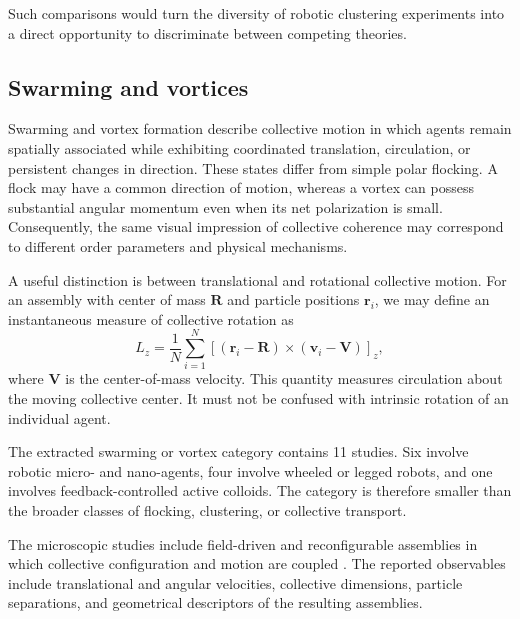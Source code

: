 Such comparisons
would turn the
diversity of
robotic clustering
experiments into
a direct opportunity
to discriminate
between competing
theories.

\subsection{Swarming and vortices}
\label{sec:phenomena-swarming}

Swarming and vortex formation describe collective motion in which
agents remain spatially associated while exhibiting coordinated
translation, circulation, or persistent changes in direction.
These states differ from simple polar flocking. A flock may have
a common direction of motion, whereas a vortex can possess
substantial angular momentum even when its net polarization
is small. Consequently, the same visual impression of
collective coherence may correspond to different order
parameters and physical mechanisms.

A useful distinction is between translational and rotational
collective motion. For an assembly with center of mass
$\mathbf R$ and particle positions $\mathbf r_i$, we may
define an instantaneous measure of collective rotation as
\begin{equation}
L_z =
\frac{1}{N}
\sum_{i=1}^{N}
\left[
(\mathbf r_i-\mathbf R)
\times
(\mathbf v_i-\mathbf V)
\right]_z ,
\label{eq:phenomena-angular-momentum}
\end{equation}
where $\mathbf V$ is the center-of-mass velocity.
This quantity measures circulation about the moving
collective center. It must not be confused with
intrinsic rotation of an individual agent.

The extracted swarming or vortex category contains
11 studies. Six involve robotic micro- and nano-agents,
four involve wheeled or legged robots, and one involves
feedback-controlled active colloids. The category is
therefore smaller than the broader classes of flocking,
clustering, or collective transport.

The microscopic studies include field-driven and
reconfigurable assemblies in which collective
configuration and motion are coupled
\cite{Tural2025dropletbasedmicrof,Chen2023nanorobotmediateds,Hanson2025electrokineticpropu,Liu2026magneticcompartment,Wang2022reconfigurablemagne,Yu2019reconfigurablecollo}.
The reported observables include translational and
angular velocities, collective dimensions, particle
separations, and geometrical descriptors of the
resulting assemblies.

